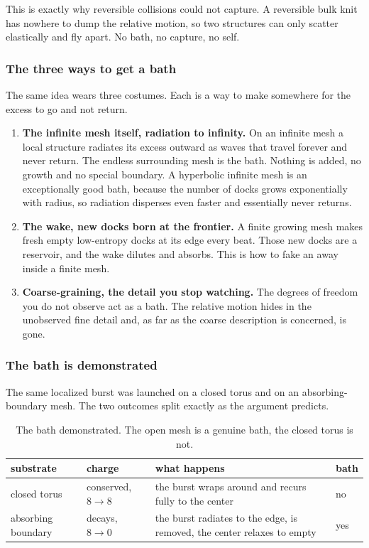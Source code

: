 This is exactly why reversible collisions could not capture. A reversible bulk knit has nowhere to dump the relative motion, so two structures can only scatter elastically and fly apart. No bath, no capture, no self.

\subsubsection{The three ways to get a bath}

The same idea wears three costumes. Each is a way to make somewhere for the excess to go and not return.

\begin{enumerate}
\item \textbf{The infinite mesh itself, radiation to infinity.} On an infinite mesh a local structure radiates its excess outward as waves that travel forever and never return. The endless surrounding mesh is the bath. Nothing is added, no growth and no special boundary. A hyperbolic infinite mesh is an exceptionally good bath, because the number of docks grows exponentially with radius, so radiation disperses even faster and essentially never returns.
\item \textbf{The wake, new docks born at the frontier.} A finite growing mesh makes fresh empty low-entropy docks at its edge every beat. Those new docks are a reservoir, and the wake dilutes and absorbs. This is how to fake an away inside a finite mesh.
\item \textbf{Coarse-graining, the detail you stop watching.} The degrees of freedom you do not observe act as a bath. The relative motion hides in the unobserved fine detail and, as far as the coarse description is concerned, is gone.
\end{enumerate}

\subsubsection{The bath is demonstrated}

The same localized burst was launched on a closed torus and on an absorbing-boundary mesh. The two outcomes split exactly as the argument predicts.

\begin{table}[ht]
\centering
\begin{tabular}{@{}p{}p{}p{}p{}@{}}
\toprule
substrate & charge & what happens & bath \\
\midrule
closed torus & conserved, $8 \to 8$ & the burst wraps around and recurs fully to the center & no \\
absorbing boundary & decays, $8 \to 0$ & the burst radiates to the edge, is removed, the center relaxes to empty & yes \\
\bottomrule
\end{tabular}
\caption{The bath demonstrated. The open mesh is a genuine bath, the closed torus is not.}
\label{tab:bath-demo}
\end{table}

